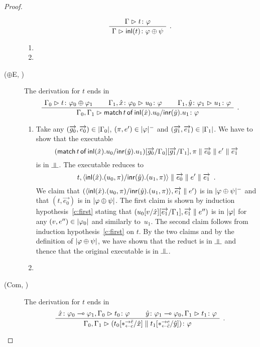 \begin{proof}
\begin{description}
	\[
	\aseq{\G}{\tj{t}{\phi}}
	\useq{\G}{\tj{\inl{t}}{\phi\oplus\psi}}
	\DisplayProof\enspace.
	\]
	\begin{enumerate}[label=\textit{(\arabic{*})}]
	 \item {}
	 \item {}
	\end{enumerate}
   \item[($\oplus$E, \textminus)]
	The derivation for $t$ ends in
	\[
	\aseq{\G_0}{\tj{t}{\phi_0\oplus\phi_1}}
	\aseq{\G_1,\tj{\hat{x}}{\phi_0}}{\tj{u_0}{\phi}}
	\aseq{\G_1,\tj{\hat{y}}{\phi_1}}{\tj{u_1}{\phi}}
	\tseq{\G_0,\G_1}{\tj{\mat{t}{\hat x}{u_0}{\hat y}{u_1}}{\phi}}
	\DisplayProof\enspace.
	\]
	\begin{enumerate}[label=\textit{(\arabic{*})}]
	 \item Take any $(\overrightarrow{g_0},\overrightarrow{e_0})\in|{\Gamma_0}|$,\quad
	       $(\pi,e')\in|{\varphi}|^-$ and
	       $(\overrightarrow{g_1},\overrightarrow{e_1})\in|{\Gamma_1}|$.
	       We have to show that the executable
	       \[
	       (\mathsf{match}\,{t}\,\mathsf{of}\, \mathsf{inl}({\hat{x}}). {u_0}/ \mathsf{inr}({\hat{y}}). {u_1})[\overrightarrow{ g_0}/\Gamma_0][\overrightarrow{g_1}/\Gamma_1],
	       \pi\parallel \overrightarrow{e_0}\parallel e'\parallel \overrightarrow{e_1}
	       \]
	       is in $\bbot$.
	       The executable reduces to
	       \[
		t,\langle \mathsf{inl}({\hat{x}}). ({u_0},{\pi})/ \mathsf{inr}({\hat{y}}). ({u_1},{\pi})\rangle\parallel\overrightarrow{e_0}\parallel
	       e'\parallel \overrightarrow{e_1}\enspace.
	       \]
	       We claim that
	       $(\langle \mathsf{inl}({\hat{x}}). ({u_0},{\pi})/ \mathsf{inr}({\hat{y}}). ({u_1},{\pi})\rangle,\overrightarrow{e_1}\parallel
	       e')$ is in $|{\varphi\oplus\psi}|^-$ and that
	       $(t,\vec{e_0})$ is in $|{\varphi\oplus\psi}|$.  The first
	       claim is shown by induction hypothesis~\ref{c:first}
	       stating that $(u_0[v/\hat{x}][\overrightarrow{e_1}/\Gamma_1], \overrightarrow{e_1}\parallel
	       e'')$ is in $|{\varphi}|$ for any $(v,e'')\in|{\varphi_0}|$
	       and similarly to~$u_1$.
	       The second claim follows from induction
	       hypothesis~\ref{c:first} on $t$.
	       By the two claims and by the definition of
	       $|{\varphi\oplus\psi}|$,
	       we have shown that the reduct is in $\bbot$ and
	       thence that the original executable is in $\bbot$.
	 \item {}
	\end{enumerate}
   \item[(Com, \textminus)]
	The derivation for $t$ ends in
	\[
	\aseq{\tj{\hat x}{\phi_0\limp\phi_1},\G_0}{\tj{t_0}{\phi}}
	\aseq{\tj{\hat y}{\phi_1\limp\phi_0},\G_1}{\tj{t_1}{\phi}}
	\bseq{\G_0,\G_1}{\tj{(t_0[\comodL/\hat x]\conc t_1
	[\comodR/\hat y])}{\phi}}
	\DisplayProof\enspace.
	\]
	\begin{enumerate}[label=\textit{(\arabic{*})}]

\end{enumerate}
\end{description}
\end{proof}
